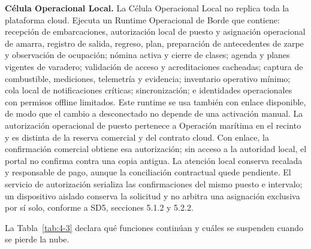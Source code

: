 \textbf{Célula Operacional Local.} La Célula Operacional Local no replica toda la plataforma cloud. Ejecuta un Runtime Operacional de Borde que contiene: recepción de embarcaciones, autorización local de puesto y asignación operacional de amarra, registro de salida, regreso, plan, preparación de antecedentes de zarpe y observación de ocupación; nómina activa y cierre de clases; agenda y planes vigentes de varadero; validación de acceso y acreditaciones cacheadas; captura de combustible, mediciones, telemetría y evidencia; inventario operativo mínimo; cola local de notificaciones críticas; sincronización; e identidades operacionales con permisos offline limitados. Este runtime se usa también con enlace disponible, de modo que el cambio a desconectado no depende de una activación manual. La autorización operacional de puesto pertenece a Operación marítima en el recinto y es distinta de la reserva comercial y del contrato cloud. Con enlace, la confirmación comercial obtiene esa autorización; sin acceso a la autoridad local, el portal no confirma contra una copia antigua. La atención local conserva recalada y responsable de pago, aunque la conciliación contractual quede pendiente. El servicio de autorización serializa las confirmaciones del mismo puesto e intervalo; un dispositivo aislado conserva la solicitud y no arbitra una asignación exclusiva por sí solo, conforme a SD5, secciones 5.1.2 y 5.2.2.

La Tabla~\ref{tab:4-3} declara qué funciones continúan y cuáles se suspenden cuando se pierde la nube.

